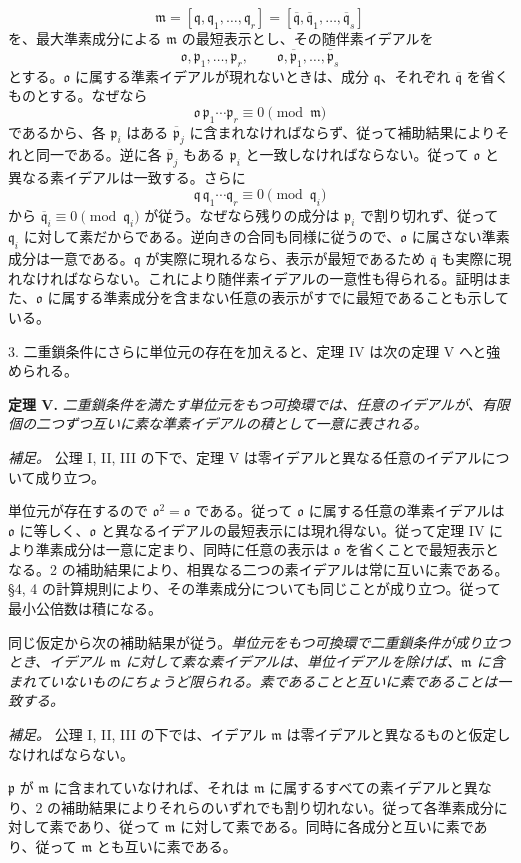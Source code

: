 \documentclass[11pt]{article}
\providecommand{\mbar}[1]{\overline{#1}}
\providecommand{\mm}{\mathfrak{m}}
\providecommand{\mo}{\mathfrak{o}}
\providecommand{\mpideal}{\mathfrak{p}}
\providecommand{\mq}{\mathfrak{q}}
\begin{document}
\[
        \mm=[\mq,\mq_1,\ldots,\mq_r]=[\mbar\mq,\mbar\mq_1,\ldots,\mbar\mq_s]
\]
を、最大準素成分による $\mm$ の最短表示とし、その随伴素イデアルを
\[
        \mo,\mpideal_1,\ldots,\mpideal_r,
        \qquad \mo,\mbar\mpideal_1,\ldots,\mbar\mpideal_s
\]
とする。$\mo$ に属する準素イデアルが現れないときは、成分 $\mq$、それぞれ $\mbar\mq$ を省くものとする。なぜなら
\[
        \mo\,\mpideal_1\cdots\mpideal_r\equiv0\pmod{\mm}
\]
であるから、各 $\mpideal_i$ はある $\mbar\mpideal_j$ に含まれなければならず、従って補助結果によりそれと同一である。逆に各 $\mbar\mpideal_j$ もある $\mpideal_i$ と一致しなければならない。従って $\mo$ と異なる素イデアルは一致する。さらに
\[
        \mq\,\mq_1\cdots\mq_r\equiv0\pmod{\mq_i}
\]
から $\mbar\mq_i\equiv0\pmod{\mq_i}$ が従う。なぜなら残りの成分は $\mpideal_i$ で割り切れず、従って $\mq_i$ に対して素だからである。逆向きの合同も同様に従うので、$\mo$ に属さない準素成分は一意である。$\mq$ が実際に現れるなら、表示が最短であるため $\mbar\mq$ も実際に現れなければならない。これにより随伴素イデアルの一意性も得られる。証明はまた、$\mo$ に属する準素成分を含まない任意の表示がすでに最短であることも示している。

3. 二重鎖条件にさらに単位元の存在を加えると、定理 IV は次の定理 V へと強められる。

\textbf{定理 V.} \emph{二重鎖条件を満たす単位元をもつ可換環では、任意のイデアルが、有限個の二つずつ互いに素な準素イデアルの積として一意に表される。}

\emph{補足。} 公理 I, II, III の下で、定理 V は零イデアルと異なる任意のイデアルについて成り立つ。

単位元が存在するので $\mo^2=\mo$ である。従って $\mo$ に属する任意の準素イデアルは $\mo$ に等しく、$\mo$ と異なるイデアルの最短表示には現れ得ない。従って定理 IV により準素成分は一意に定まり、同時に任意の表示は $\mo$ を省くことで最短表示となる。2 の補助結果により、相異なる二つの素イデアルは常に互いに素である。§4, 4 の計算規則により、その準素成分についても同じことが成り立つ。従って最小公倍数は積になる。

同じ仮定から次の補助結果が従う。\emph{単位元をもつ可換環で二重鎖条件が成り立つとき、イデアル $\mm$ に対して素な素イデアルは、単位イデアルを除けば、$\mm$ に含まれていないものにちょうど限られる。素であることと互いに素であることは一致する。}

\emph{補足。} 公理 I, II, III の下では、イデアル $\mm$ は零イデアルと異なるものと仮定しなければならない。

$\mpideal$ が $\mm$ に含まれていなければ、それは $\mm$ に属するすべての素イデアルと異なり、2 の補助結果によりそれらのいずれでも割り切れない。従って各準素成分に対して素であり、従って $\mm$ に対して素である。同時に各成分と互いに素であり、従って $\mm$ とも互いに素である。
\end{document}
